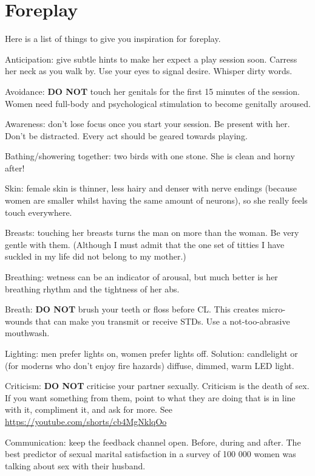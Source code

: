 \section{Foreplay}
Here is a list of things to give you inspiration for foreplay.
\begin{outline}
\1 Anticipation: give subtle hints to make her expect a play session soon. Carress her neck as you walk by. Use your eyes to signal desire. Whisper dirty words.

\1 Avoidance: \textbf{DO NOT} touch her genitals for the first 15 minutes of the session. Women need full-body and psychological stimulation to become genitally aroused.

\1 Awareness: don't lose focus once you start your session. Be present with her. Don't be distracted. Every act should be geared towards playing.

\1 Bathing/showering together: two birds with one stone. She is clean and horny after!

\1 Skin: female skin is thinner, less hairy and denser with nerve endings (because women are smaller whilst having the same amount of neurons), so she really feels touch everywhere.

\1 Breasts: touching her breasts turns the man on more than the woman. Be very gentle with them. (Although I must admit that the one set of titties I have suckled in my life did not belong to my mother.)

\1 Breathing: wetness can be an indicator of arousal, but much better is her breathing rhythm and the tightness of her abs.

\1 Breath: \textbf{DO NOT} brush your teeth or floss before CL. This creates micro-wounds that can make you transmit or receive STDs. Use a not-too-abrasive mouthwash.

\1 Lighting: men prefer lights on, women prefer lights off. Solution: candlelight or (for moderns who don't enjoy fire hazards) diffuse, dimmed, warm LED light.

\1 Criticism: \textbf{DO NOT} criticise your partner sexually. Criticism is the death of sex. If you want something from them, point to what they are doing that is in line with it, compliment it, and ask for more. See \url{https://youtube.com/shorts/cb4MgNklqOo}

\1 Communication: keep the feedback channel open. Before, during and after. The best predictor of sexual marital satisfaction in a survey of 100 000 women was talking about sex with their husband.


\end{outline}
